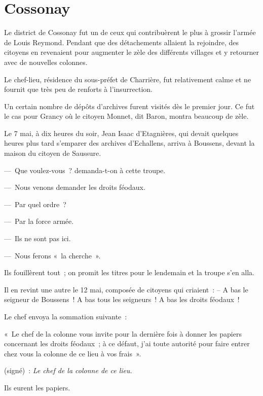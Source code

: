 \documentclass[french,twoside]{book} %
\newenvironment{quoteblock}%
  {\begin{quoting}}
  {\end{quoting}}
\newenvironment{quotebar}{%
    \def\FrameCommand{{\color{rubric!10!}\vrule width 0.5em} \hspace{0.9em}}%
    \def\OuterFrameSep{\itemsep} %
    \MakeFramed {\advance\hsize-\width \FrameRestore}
  }%
  {%
    \endMakeFramed
  }
\renewenvironment{quoteblock}%
  {%
    \savenotes
    \setstretch{0.9}
    \normalfont
    \begin{quotebar}
  }
  {%
    \end{quotebar}
    \spewnotes
  }
\begin{document}
\section[{Cossonay}]{Cossonay}
\noindent Le district de Cossonay fut un de ceux qui contribuèrent le plus à grossir l’armée de Louis Reymond. Pendant que des détachements allaient la rejoindre, des citoyens en revenaient pour augmenter le zèle des différents villages et y retourner avec de nouvelles colonnes.\par
Le chef-lieu, résidence du sous-préfet de Charrière, fut relativement calme et ne fournit que très peu de renforts à l’insurrection.\par
Un certain nombre de dépôts d’archives furent visités dès le premier jour. Ce fut le cas pour Grancy où le citoyen Monnet, dit Baron, montra beaucoup de zèle.\par
Le 7 mai, à dix heures du soir, Jean Isaac d’Etagnières, qui devait quelques heures plus tard s’emparer des archives d’Echallens, arriva à Boussens, devant la maison du citoyen de Saussure.\par
— Que voulez-vous ? demanda-t-on à cette troupe.\par
— Nous venons demander les droits féodaux.\par
— Par quel ordre ?\par
— Par la force armée.\par
— Ils ne sont pas ici.\par
— Nous ferons « la cherche ».\par
Ils fouillèrent tout ; on promit les titres pour le lendemain et la troupe s’en alla.\par
Il en revint une autre le 12 mai, composée de citoyens qui criaient : – A bas le seigneur de Boussens ! A bas tous les seigneurs ! A bas les droits féodaux !\par
Le chef envoya la sommation suivante :\par

\begin{quoteblock}
 \noindent « Le chef de la colonne vous invite pour la dernière fois à donner les papiers concernant les droits féodaux ; à ce défaut, j’ai toute autorité pour faire entrer chez vous la colonne de ce lieu à vos frais ».\par
 (signé) : \emph{Le chef de la colonne de ce lieu.}
 \end{quoteblock}

\noindent Ils eurent les papiers.\par
\end{document}
